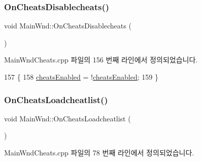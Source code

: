 \subsubsection{\texorpdfstring{On\+Cheats\+Disablecheats()}{OnCheatsDisablecheats()}}
{\footnotesize\ttfamily void Main\+Wnd\+::\+On\+Cheats\+Disablecheats (\begin{DoxyParamCaption}{ }\end{DoxyParamCaption})\hspace{0.3cm}{\ttfamily [protected]}}



Main\+Wnd\+Cheats.\+cpp 파일의 156 번째 라인에서 정의되었습니다.


\begin{DoxyCode}
157 \{
158   \mbox{\hyperlink{gb_cheats_8cpp_a77d9fae8175282841c0cdda4dd1dc24a}{cheatsEnabled}} = !\mbox{\hyperlink{gb_cheats_8cpp_a77d9fae8175282841c0cdda4dd1dc24a}{cheatsEnabled}};
159 \}
\end{DoxyCode}
\mbox{\label{class_main_wnd_a576e72b77e11a1e9f92b00279023b755}} 
\subsubsection{\texorpdfstring{On\+Cheats\+Loadcheatlist()}{OnCheatsLoadcheatlist()}}
{\footnotesize\ttfamily void Main\+Wnd\+::\+On\+Cheats\+Loadcheatlist (\begin{DoxyParamCaption}{ }\end{DoxyParamCaption})\hspace{0.3cm}{\ttfamily [protected]}}



Main\+Wnd\+Cheats.\+cpp 파일의 78 번째 라인에서 정의되었습니다.


